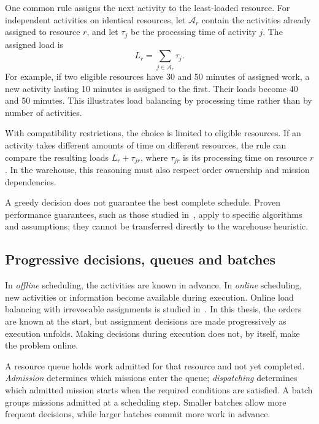 One common rule assigns the next activity to the least-loaded resource.
For independent activities on identical resources, let $\mathcal A_r$ contain
the activities already assigned to resource $r$, and let $\tau_j$ be the
processing time of activity $j$. The assigned load is
\begin{equation}
    L_r=\sum_{j\in\mathcal A_r}\tau_j.
    \label{eq:theory-assigned-load}
\end{equation}
For example, if two eligible resources have 30 and 50 minutes of assigned work,
a new activity lasting 10 minutes is assigned to the first. Their loads become
40 and 50 minutes. This illustrates load balancing by processing time rather
than by number of activities.

With compatibility restrictions, the choice is limited to eligible resources.
If an activity takes different amounts of time on different resources, the
rule can compare the resulting loads $L_r+\tau_{jr}$, where $\tau_{jr}$ is its
processing time on resource $r$. In the warehouse, this reasoning must also
respect order ownership and mission dependencies.

A greedy decision does not guarantee the best complete schedule. Proven
performance guarantees, such as those studied in~\cite{4568274}, apply to
specific algorithms and assumptions; they cannot be transferred directly to
the warehouse heuristic.

\subsection{Progressive decisions, queues and batches}
\label{sec:theory-batch-queues}

In \textit{offline} scheduling, the activities are known in advance. In
\textit{online} scheduling, new activities or information become available
during execution. Online load balancing with irrevocable assignments is
studied in~\cite{aspnes1997online}. In this thesis, the orders are known at the
start, but assignment decisions are made progressively as execution unfolds.
Making decisions during execution does not, by itself, make the problem online.

A resource queue holds work admitted for that resource and not yet completed.
\textit{Admission} determines which missions enter the queue;
\textit{dispatching} determines which admitted mission starts when the required
conditions are satisfied. A batch groups missions admitted at a scheduling
step. Smaller batches allow more frequent decisions, while larger batches
commit more work in advance.

